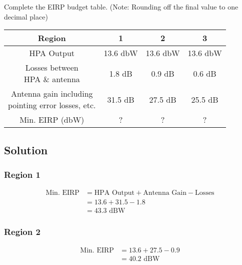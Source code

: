 \documentclass[titlepage]{article}
\begin{document}
\begin{tcolorbox}
    Complete the EIRP budget table. (Note: Rounding off the final value to one decimal place)
    \begin{center}
        \begin{tabular}{||c | c | c | c||}
            \hline
            Region          & 1        & 2        & 3        \\[0.5ex]
            \hline\hline
            HPA Output      & 13.6 dbW & 13.6 dbW & 13.6 dbW \\[0.5ex]
            \hline
            \makecell{Losses between                         \\ HPA \& antenna} & 1.8 dB & 0.9 dB & 0.6 dB \\[0.5ex]
            \hline
            \makecell{Antenna gain including                 \\ pointing error losses, etc.} & 31.5 dB & 27.5 dB & 25.5 dB \\[0.5ex]
            \hline
            Min. EIRP (dbW) & ?        & ?        & ?        \\[0.5ex]
            \hline
        \end{tabular}
    \end{center}
\end{tcolorbox}

\subsection{Solution}
\subsubsection*{Region 1}
\begin{align}
    \text{Min. EIRP} & = \text{HPA Output} + \text{Antenna Gain} - \text{Losses} \nonumber \\
                     & = 13.6 + 31.5 - 1.8 \nonumber                                       \\
                     & = 43.3 \text{ dBW} \nonumber
\end{align}

\subsubsection*{Region 2}
\begin{align}
    \text{Min. EIRP} & = 13.6 + 27.5 - 0.9 \nonumber \\
                     & = 40.2 \text{ dBW} \nonumber
\end{align}
\end{document}
